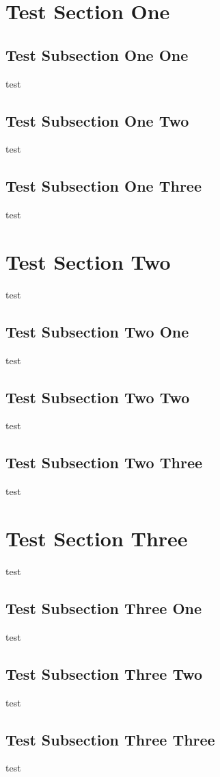 \documentclass[10pt,aspectratio=169]{beamer}
\begin{document}
\section{Test Section One}
\subsection{Test Subsection One One}
\begin{frame} test\end{frame}
\subsection{Test Subsection One Two}
\begin{frame} test\end{frame}
\subsection{Test Subsection One Three}
\begin{frame} test\end{frame}

\section{Test Section Two}
\begin{frame} test\end{frame}
\subsection{Test Subsection Two One}
\begin{frame} test\end{frame}
\subsection{Test Subsection Two Two}
\begin{frame} test\end{frame}
\subsection{Test Subsection Two Three}
\begin{frame} test\end{frame}

\section{Test Section Three}
\begin{frame} test\end{frame}
\subsection{Test Subsection Three One}
\begin{frame} test\end{frame}
\subsection{Test Subsection Three Two}
\begin{frame} test\end{frame}
\subsection{Test Subsection Three Three}
\begin{frame} test\end{frame}
\end{document}

